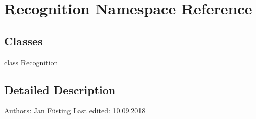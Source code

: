 \hypertarget{namespace_recognition}{}\section{Recognition Namespace Reference}
\label{namespace_recognition}
\subsection*{Classes}
\begin{DoxyCompactItemize}
\item 
class \mbox{\hyperlink{class_recognition_1_1_recognition}{Recognition}}
\end{DoxyCompactItemize}


\subsection{Detailed Description}
\begin{DoxyVerb}Authors:        Jan Füsting
Last edited:    10.09.2018
\end{DoxyVerb}
 